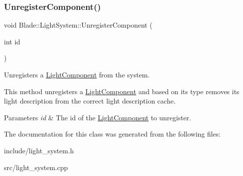 \subsubsection{\texorpdfstring{Unregister\+Component()}{UnregisterComponent()}}
{\footnotesize\ttfamily void Blade\+::\+Light\+System\+::\+Unregister\+Component (\begin{DoxyParamCaption}\item[{int}]{id }\end{DoxyParamCaption})\hspace{0.3cm}{\ttfamily [noexcept]}}



Unregisters a \hyperlink{class_blade_1_1_light_component}{Light\+Component} from the system. 

This method unregisters a \hyperlink{class_blade_1_1_light_component}{Light\+Component} and based on it\textquotesingle{}s type removes it\textquotesingle{}s light description from the correct light description cache. 
\begin{DoxyParams}{Parameters}
{\em id} & The id of the \hyperlink{class_blade_1_1_light_component}{Light\+Component} to unregister. \\
\hline
\end{DoxyParams}


The documentation for this class was generated from the following files\+:\begin{DoxyCompactItemize}
\item 
include/light\+\_\+system.\+h\item 
src/light\+\_\+system.\+cpp\end{DoxyCompactItemize}
